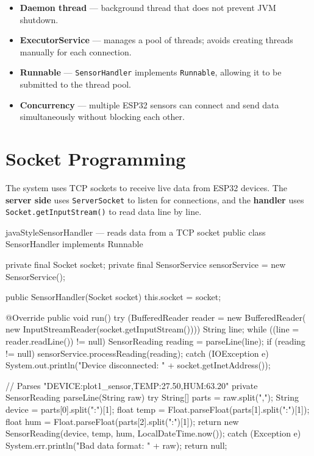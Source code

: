 \documentclass[12pt, a4paper]{report}
\begin{document}
\begin{tcolorbox}[infobox, title={Multithreading Concepts Demonstrated}]
\begin{itemize}[noitemsep]
    \item \textbf{Daemon thread} --- background thread that does not prevent JVM shutdown.
    \item \textbf{ExecutorService} --- manages a pool of threads; avoids creating threads manually for each connection.
    \item \textbf{Runnable} --- \texttt{SensorHandler} implements \texttt{Runnable}, allowing it to be submitted to the thread pool.
    \item \textbf{Concurrency} --- multiple ESP32 sensors can connect and send data simultaneously without blocking each other.
\end{itemize}
\end{tcolorbox}


\section{Socket Programming}

The system uses TCP sockets to receive live data from ESP32 devices. The \textbf{server side} uses \texttt{ServerSocket} to listen for connections, and the \textbf{handler} uses \texttt{Socket.getInputStream()} to read data line by line.

\begin{codeblock}{javaStyle}{SensorHandler --- reads data from a TCP socket}
public class SensorHandler implements Runnable {
    private final Socket socket;
    private final SensorService sensorService = new SensorService();

    public SensorHandler(Socket socket) {
        this.socket = socket;
    }

    @Override
    public void run() {
        try (BufferedReader reader = new BufferedReader(
                new InputStreamReader(socket.getInputStream()))) {
            String line;
            while ((line = reader.readLine()) != null) {
                SensorReading reading = parseLine(line);
                if (reading != null) {
                    sensorService.processReading(reading);
                }
            }
        } catch (IOException e) {
            System.out.println("Device disconnected: "
                + socket.getInetAddress());
        }
    }

    // Parses "DEVICE:plot1_sensor,TEMP:27.50,HUM:63.20"
    private SensorReading parseLine(String raw) {
        try {
            String[] parts = raw.split(",");
            String device = parts[0].split(":")[1];
            float  temp   = Float.parseFloat(parts[1].split(":")[1]);
            float  hum    = Float.parseFloat(parts[2].split(":")[1]);
            return new SensorReading(device, temp, hum,
                                     LocalDateTime.now());
        } catch (Exception e) {
            System.err.println("Bad data format: " + raw);
            return null;
        }
    }
}
\end{codeblock}
\end{document}
